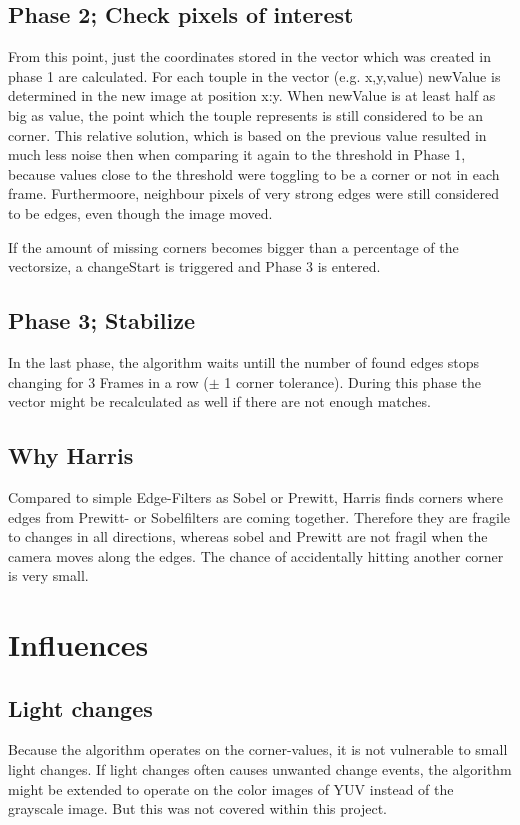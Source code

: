 \subsection{Phase 2; Check pixels of interest}
From this point, just the coordinates stored in the vector which was created in phase 1 are calculated.  For each touple in the vector (e.g. x,y,value) newValue is determined in the new image at position x:y. When newValue is at least half as big as value, the point which the touple represents is still considered to be an corner. This relative solution, which is based on the previous value resulted in much less noise then when comparing it again to the threshold in Phase 1, because values close to the threshold were toggling to be a corner or not in each frame. Furthermoore, neighbour pixels of very strong edges were still considered to be edges, even though the image moved. 

If the amount of missing corners becomes bigger than a percentage of the vectorsize, a changeStart is triggered and Phase 3 is entered.

\subsection{Phase 3;  Stabilize}
In the last phase, the algorithm waits untill the number of found edges stops changing for  3 Frames in a row ($\pm$ 1 corner tolerance). During this phase the vector might be recalculated as well if there are not enough matches.

\subsection{Why Harris}
Compared to simple Edge-Filters as Sobel or Prewitt, Harris finds corners where edges from Prewitt- or Sobelfilters are coming together. Therefore they are fragile to changes in all directions, whereas sobel and Prewitt are not fragil when the camera moves along the edges. The chance of accidentally hitting another corner is very small.



\section{Influences}
\subsection{Light changes}
Because the algorithm operates on the corner-values, it is not vulnerable to small light changes. If light changes often causes unwanted change events, the algorithm might be extended to operate on the color images of YUV instead of the grayscale image. But this was not covered within this project.

